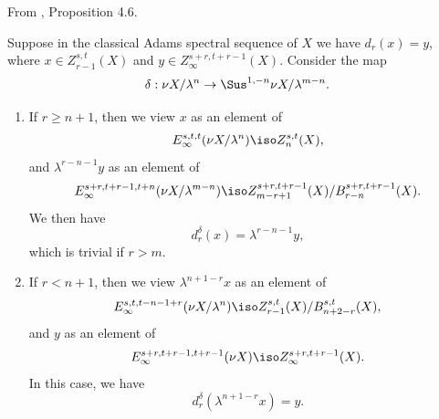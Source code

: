 \begin{proposition}
\label{paper:4.6}
From \cite{LWX126}, Proposition 4.6.\par
\label{prop:6de7d130}
    Suppose in the classical Adams spectral sequence of $X$ we have $d_r(x)=y$, where $x\in Z_{r-1}^{s,t}(X)$ and $y\in Z_\infty^{s+r,t+r-1}(X)$. Consider the map
    $$\delta:\nu X/\lambda^n\to \Sus^{1,-n}\nu X/\lambda^{m-n}.$$
    \begin{enumerate}
        \item If $r\ge n+1$, then we view $x$ as an element of 
        $$E_\infty^{s,t,t}(\nu X/\lambda^n)\iso Z_n^{s,t}(X),$$
        and $\lambda^{r-n-1} y$ as an element of 
        $$E_\infty^{s+r,t+r-1, t+n}(\nu X/\lambda^{m-n})\iso Z_{m-r+1}^{s+r,t+r-1}(X)/B_{r-n}^{s+r,t+r-1}(X).$$
        We then have
        $$d^{\delta}_r(x)=\lambda^{r-n-1}y,$$
        which is trivial if $r>m$.
        \item If $r<n+1$, then we view $\lambda^{n+1-r}x$ as an element of 
        $$E_\infty^{s,t,t-n-1+r}(\nu X/\lambda^n)\iso Z^{s,t}_{r-1}(X)/B^{s,t}_{n+2-r}(X),$$
        and $y$ as an element of 
        $$E_\infty^{s+r,t+r-1, t+r-1}(\nu X)\iso Z_\infty^{s+r,t+r-1}(X).$$
        In this case, we have
        $$d^{\delta}_r(\lambda^{n+1-r}x)=y.$$
    \end{enumerate}


\end{proposition}
